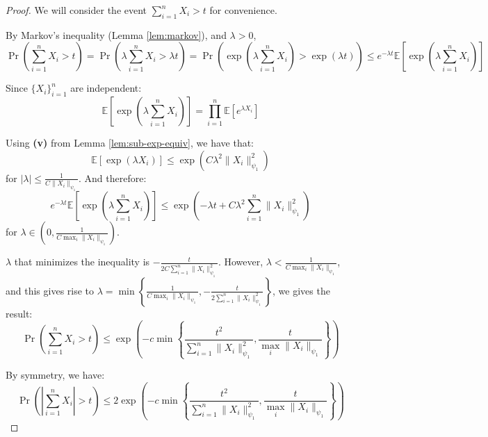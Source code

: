 \documentclass{article}
\theoremstyle{remark}
\newcommand{\Exp}{\mathbb{E}}
\begin{document}
\begin{proof}
We will consider the event \(\sum\limits_{i=1}^{n} X_{i} > t\) for convenience.

By Markov's inequality (Lemma \ref{lem:markov}), and \(\lambda > 0\),
\begin{equation*}
\Pr\left(\sum_{i=1}^{n} X_{i} > t\right) = \Pr\left(\lambda \sum_{i=1}^{n} X_{i} > \lambda t \right) = \Pr\left(\exp\left(\lambda \sum_{i=1}^{n}X_{i}\right) > \exp(\lambda t)\right) \leq e^{-\lambda t} \Exp\left[\exp\left(\lambda \sum_{i=1}^{n} X_{i}\right)\right]
\end{equation*}

Since \(\{X_{i}\}_{i=1}^{n}\) are independent:
\begin{equation*}
\Exp\left[\exp\left(\lambda \sum_{i=1}^{n} X_{i}\right)\right] = \prod_{i=1}^{n} \Exp\left[e^{\lambda X_{i}}\right]
\end{equation*}

Using \textbf{(v)} from Lemma \ref{lem:sub-exp-equiv}, we have that:
\begin{equation*}
\Exp\left[\exp(\lambda X_{i})\right] \leq \exp(C \lambda^{2} \|X_{i}\|_{\psi_{1}}^{2})
\end{equation*}
for \(|\lambda| \leq \frac{1}{C\|X_{i}\|_{\psi_{1}}}\). And therefore:
\begin{equation*}
e^{-\lambda t} \Exp\left[\exp\left(\lambda \sum_{i=1}^{n} X_{i}\right)\right] \leq \exp\left(-\lambda t + C \lambda^{2} \sum_{i=1}^{n}\|X_{i}\|_{\psi_{1}}^{2}\right)
\end{equation*}
for \(\lambda \in \left(0, \frac{1}{C \max_{i}\|X_{i}\|_{\psi_{1}}}\right)\).

\(\lambda\) that minimizes the inequality is \(-\frac{t}{2 C \sum\limits_{i=1}^{n}\|X_{i}\|_{\psi_{1}}^{2}}\). However, \(\lambda < \frac{1}{C \max_{i}\|X_{i}\|_{\psi_{1}}}\), and this gives rise to \(\lambda = \min\left\{\frac{1}{C\max_{i} \|X_{i}\|_{\psi_{1}}}, -\frac{t}{2 \sum\limits_{i=1}^{n}\|X_{i}\|_{\psi_{1}}^{2}}\right\}\), we gives the result:
\begin{equation*}
\Pr\left(\sum_{i=1}^{n} X_{i} > t\right) \leq \exp\left(-c \min\left\{\frac{t^{2}}{\sum\limits_{i=1}^{n}\|X_{i}\|_{\psi_{1}}^{2}}, \frac{t}{\max\limits_{i} \|X_{i}\|_{\psi_{1}}}\right\}\right)
\end{equation*}

By symmetry, we have:
\begin{equation*}
\Pr\left(\left|\sum_{i=1}^{n} X_{i}\right| > t\right) \leq 2\exp\left(-c \min\left\{\frac{t^{2}}{\sum\limits_{i=1}^{n}\|X_{i}\|_{\psi_{1}}^{2}}, \frac{t}{\max\limits_{i} \|X_{i}\|_{\psi_{1}}}\right\}\right)
\end{equation*}
\end{proof}
\end{document}
